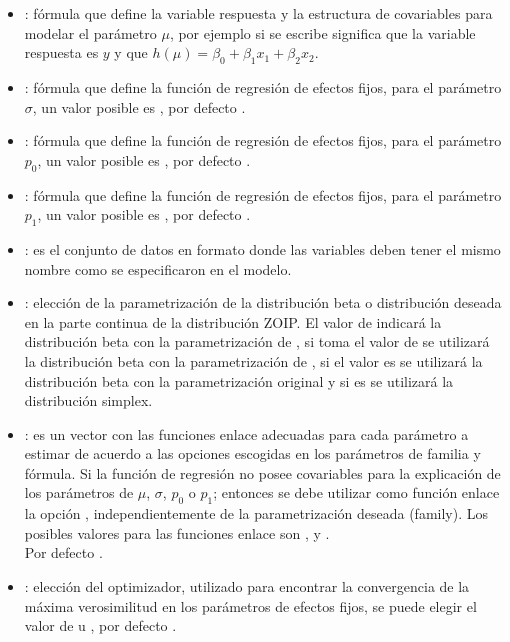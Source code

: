 \begin{itemize}[noitemsep, nolistsep]

\item {}: f\'{o}rmula que define la variable respuesta y la estructura de covariables para modelar el par\'{a}metro $\mu$, por ejemplo si se escribe  significa que la variable respuesta es $y$ y que $h(\mu)=\beta_0 + \beta_1 x_1 + \beta_2 x_2$.
\item {}: f\'{o}rmula que define la funci\'{o}n de regresi\'{o}n de efectos fijos, para el par\'{a}metro $\sigma$, un valor posible es , por defecto .
\item {}: f\'{o}rmula que define la funci\'{o}n de regresi\'{o}n de efectos fijos, para el par\'{a}metro $p_0$, un valor posible es , por defecto .
\item {}: f\'{o}rmula que define la funci\'{o}n de regresi\'{o}n de efectos fijos, para el par\'{a}metro $p_1$, un valor posible es , por defecto .
\item {}: es el conjunto de datos en formato  donde las variables deben tener el mismo nombre como se especificaron en el modelo.
\item {}: elecci\'{o}n de la parametrizaci\'{o}n de la distribuci\'{o}n beta o distribuci\'{o}n deseada en la parte continua de la distribuci\'{o}n ZOIP. El valor de  indicar\'{a} la distribuci\'{o}n beta con la parametrizaci\'{o}n de \cite{Stasinopoulos2}, si toma el valor de  se utilizar\'{a} la distribuci\'{o}n beta con la parametrizaci\'{o}n de \cite{Ferrari2}, si el valor es  se utilizar\'{a} la distribuci\'{o}n beta con la parametrizaci\'{o}n original y si es  se utilizar\'{a} la distribuci\'{o}n simplex.
\item {}: es un vector con las funciones enlace adecuadas para cada par\'{a}metro a estimar de acuerdo a las opciones escogidas en los par\'{a}metros de familia y f\'{o}rmula. Si la funci\'{o}n de regresi\'{o}n no posee covariables para la explicaci\'{o}n de los par\'{a}metros de $\mu$, $\sigma$, $p_0$ o $p_1$; entonces se debe utilizar como funci\'{o}n enlace la opci\'{o}n , independientemente de la parametrizaci\'{o}n deseada (family). Los posibles valores para las funciones enlace son ,  y .\\
Por defecto .
\item {}: elecci\'{o}n del optimizador, utilizado para encontrar la convergencia de la m\'{a}xima verosimilitud en los par\'{a}metros de efectos fijos, se puede elegir el valor de  u , por defecto .


\end{itemize}

